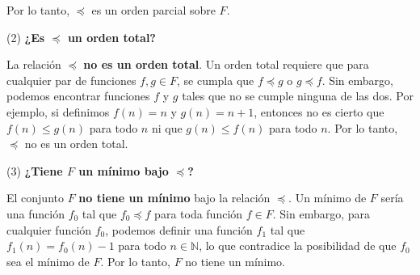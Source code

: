 \documentclass[12pt]{article}
\begin{document}
Por lo tanto, \(\preceq\) es un orden parcial sobre \(F\).

(2) \textbf{¿Es \(\preceq\) un orden total?}

La relación \(\preceq\) \textbf{no es un orden total}. Un orden total requiere que para cualquier par de funciones \(f, g \in F\), se cumpla que \(f \preceq g\) o \(g \preceq f\). Sin embargo, podemos encontrar funciones \(f\) y \(g\) tales que no se cumple ninguna de las dos. Por ejemplo, si definimos \(f(n) = n\) y \(g(n) = n + 1\), entonces no es cierto que \(f(n) \leq g(n)\) para todo \(n\) ni que \(g(n) \leq f(n)\) para todo \(n\). Por lo tanto, \(\preceq\) no es un orden total.

(3) \textbf{¿Tiene \(F\) un mínimo bajo \(\preceq\)?}

El conjunto \(F\) \textbf{no tiene un mínimo} bajo la relación \(\preceq\). Un mínimo de \(F\) sería una función \(f_0\) tal que \(f_0 \preceq f\) para toda función \(f \in F\). Sin embargo, para cualquier función \(f_0\), podemos definir una función \(f_1\) tal que \(f_1(n) = f_0(n) - 1\) para todo \(n \in \mathbb{N}\), lo que contradice la posibilidad de que \(f_0\) sea el mínimo de \(F\). Por lo tanto, \(F\) no tiene un mínimo.


\end{document}
